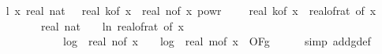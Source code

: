 \begin{isabellebody}
\isanewline
\ \ \isamarkupfalse%
\ l{}{\isacharcolon}{\kern0pt}\ {\isachardoublequoteopen}{\isacharparenleft}{\kern0pt}{\isasymlambda}x{\isachardot}{\kern0pt}\ real\ {\isacharparenleft}{\kern0pt}nat\ {\isasymlceil}{}\ {\isacharasterisk}{\kern0pt}\ real\ {\isacharparenleft}{\kern0pt}k{\isacharunderscore}{\kern0pt}of\ x{\isacharparenright}{\kern0pt}\ {\isacharasterisk}{\kern0pt}\ real\ {\isacharparenleft}{\kern0pt}n{\isacharunderscore}{\kern0pt}of\ x{\isacharparenright}{\kern0pt}\ powr\ {\isacharparenleft}{\kern0pt}{}\ {\isacharminus}{\kern0pt}\ {}\ {\isacharslash}{\kern0pt}\ real\ {\isacharparenleft}{\kern0pt}k{\isacharunderscore}{\kern0pt}of\ x{\isacharparenright}{\kern0pt}{\isacharparenright}{\kern0pt}\ {\isacharslash}{\kern0pt}\ {\isacharparenleft}{\kern0pt}real{\isacharunderscore}{\kern0pt}of{\isacharunderscore}{\kern0pt}rat\ {\isacharparenleft}{\kern0pt}{\isasymdelta}{\isacharunderscore}{\kern0pt}of\ x{\isacharparenright}{\kern0pt}{\isacharparenright}{\kern0pt}\ {\isacharasterisk}{\kern0pt}\isanewline
\ \ \ \ \ \ \ \ \ \ real\ {\isacharparenleft}{\kern0pt}nat\ {\isasymlceil}{\isacharminus}{\kern0pt}\ {\isacharparenleft}{\kern0pt}{}{}\ {\isacharasterisk}{\kern0pt}\ ln\ {\isacharparenleft}{\kern0pt}real{\isacharunderscore}{\kern0pt}of{\isacharunderscore}{\kern0pt}rat\ {\isacharparenleft}{\kern0pt}{\isasymepsilon}{\isacharunderscore}{\kern0pt}of\ x{\isacharparenright}{\kern0pt}{\isacharparenright}{\kern0pt}{\isacharparenright}{\kern0pt}{\isasymrceil}{\isacharparenright}{\kern0pt}\ {\isacharasterisk}{\kern0pt}\isanewline
\ \ \ \ \ \ \ \ \ \ {\isacharparenleft}{\kern0pt}{}\ {\isacharplus}{\kern0pt}\ {}\ {\isacharasterisk}{\kern0pt}\ log\ {}\ {\isacharparenleft}{\kern0pt}real\ {\isacharparenleft}{\kern0pt}n{\isacharunderscore}{\kern0pt}of\ x{\isacharparenright}{\kern0pt}{\isacharparenright}{\kern0pt}\ {\isacharplus}{\kern0pt}\ {}\ {\isacharasterisk}{\kern0pt}\ log\ {}\ {\isacharparenleft}{\kern0pt}real\ {\isacharparenleft}{\kern0pt}m{\isacharunderscore}{\kern0pt}of\ x{\isacharparenright}{\kern0pt}{\isacharparenright}{\kern0pt}{\isacharparenright}{\kern0pt}{\isacharparenright}{\kern0pt}\ {\isasymin}\ O{\isacharbrackleft}{\kern0pt}{\isacharquery}{\kern0pt}F{\isacharbrackright}{\kern0pt}{\isacharparenleft}{\kern0pt}g{\isacharparenright}{\kern0pt}{\isachardoublequoteclose}\isanewline
\ \ \ \ \isamarkupfalse%
\ {\isacharparenleft}{\kern0pt}simp\ add{\isacharcolon}{\kern0pt}g{\isacharunderscore}{\kern0pt}def{\isacharparenright}{\kern0pt}\isanewline

\end{isabellebody}
